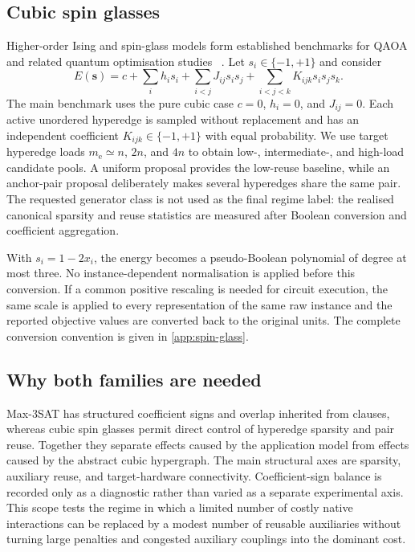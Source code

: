 \documentclass[a4paper,onecolumn,11pt,unpublished]{quantumarticle}
\theoremstyle{remark}
\begin{document}
\subsection{Cubic spin glasses}

Higher-order Ising and spin-glass models form established benchmarks for QAOA
and related quantum optimisation studies
~\cite{Basso2022,PelofskeShortDepth2024,Pelofske2024}.
Let $s_i\in\{-1,+1\}$ and consider
\begin{equation}
    E(\bm s)=c+\sum_i h_is_i+\sum_{i<j}J_{ij}s_is_j
      +\sum_{i<j<k}K_{ijk}s_is_js_k.
    \label{eq:cubic-spin}
\end{equation}
The main benchmark uses the pure cubic case $c=0$, $h_i=0$, and
$J_{ij}=0$.  Each active unordered hyperedge is sampled without replacement
and has an independent coefficient $K_{ijk}\in\{-1,+1\}$ with equal
probability.  We use target hyperedge loads $m_{\mathrm e}\simeq n$, $2n$,
and $4n$ to obtain low-, intermediate-, and high-load candidate pools.  A
uniform proposal provides the low-reuse baseline, while an anchor-pair
proposal deliberately makes several hyperedges share the same pair.  The
requested generator class is not used as the final regime label: the realised
canonical sparsity and reuse statistics are measured after Boolean conversion
and coefficient aggregation.

With $s_i=1-2x_i$, the energy becomes a pseudo-Boolean polynomial of degree at
most three.  No instance-dependent normalisation is applied before this
conversion.  If a common positive rescaling is needed for circuit execution,
the same scale is applied to every representation of the same raw instance and
the reported objective values are converted back to the original units.  The
complete conversion convention is given in \cref{app:spin-glass}.

\subsection{Why both families are needed}

Max-3SAT has structured coefficient signs and overlap inherited from clauses,
whereas cubic spin glasses permit direct control of hyperedge sparsity and pair
reuse.  Together they separate effects caused by the application model from
effects caused by the abstract cubic hypergraph.  The main structural axes are
sparsity, auxiliary reuse, and target-hardware connectivity.  Coefficient-sign
balance is recorded only as a diagnostic rather than varied as a separate
experimental axis.  This scope tests the regime in which a limited number of
costly native interactions can be replaced by a modest number of reusable
auxiliaries without turning large penalties and congested auxiliary couplings
into the dominant cost.
\end{document}
